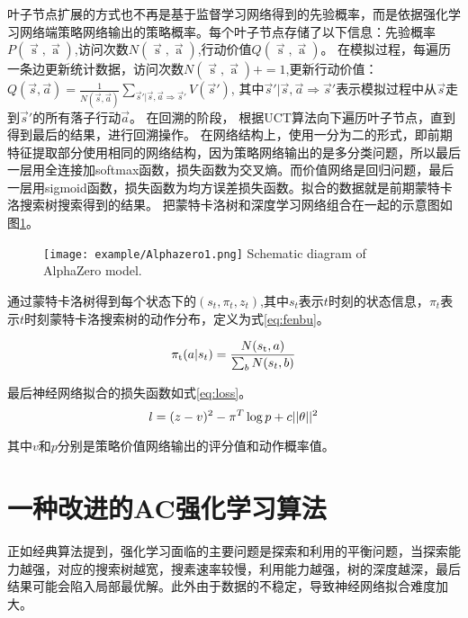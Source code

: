 叶子节点扩展的方式也不再是基于监督学习网络得到的先验概率，而是依据强化学习网络端策略网络输出的策略概率。每个叶子节点存储了以下信息：先验概率$P(\mathop s\limits^ \to  ,\mathop a\limits^ \to  )$,访问次数$N(\mathop s\limits^ \to  ,\mathop a\limits^ \to  )$,行动价值$Q(\mathop s\limits^ \to  ,\mathop a\limits^ \to  )$。
在模拟过程，每遍历一条边更新统计数据，访问次数${N(\mathop s\limits^ \to  ,\mathop a\limits^ \to  )} +=1$,更新行动价值：$Q(\vec{s},\vec{a})=\frac{1}{N(\vec{s},\vec{a})}\sum_{\vec{s}'\vert \vec{s},\vec{a}\Rightarrow \vec{s}'}V(\vec{s}')$, 其中$\vec{s}'\vert \vec{s},\vec{a} \Rightarrow \vec{s}'$表示模拟过程中从$\vec{s}$走到$\vec{s}'$的所有落子行动$\vec{a}$。
在回溯的阶段，
根据UCT算法向下遍历叶子节点，直到得到最后的结果，进行回溯操作。
在网络结构上，使用一分为二的形式，即前期特征提取部分使用相同的网络结构，因为策略网络输出的是多分类问题，所以最后一层用全连接加softmax函数，损失函数为交叉熵。而价值网络是回归问题，最后一层用sigmoid函数，损失函数为均方误差损失函数。拟合的数据就是前期蒙特卡洛搜索树搜索得到的结果。
把蒙特卡洛树和深度学习网络组合在一起的示意图如图\ref{fig:Alphazero1}。

\begin{figure}[htbp]
	\centering
	\texttt{[image: example/Alphazero1.png]}
	{Schematic diagram of AlphaZero model.}
	\label{fig:Alphazero1}
\end{figure}

通过蒙特卡洛树得到每个状态下的$({s_t},{\pi _t},{z_t})$,其中$s_t$表示$t$时刻的状态信息，$\pi_t$表示$t$时刻蒙特卡洛搜索树的动作分布，定义为式\ref{eq:fenbu}。

\begin{equation}
\label{eq:fenbu}
{\pi _{\rm{t}}}(a|{s_t}) = \frac{{N({s_{\rm{t}}},a)}}{{\sum\nolimits_b {N({s_t},b)} }}
\end{equation}

最后神经网络拟合的损失函数如式\ref{eq:loss}。
\begin{equation}
\label{eq:loss}
l = {(z - v)^2} - {\pi ^T}\log p + c{\rm{||}}\theta {\rm{|}}{{\rm{|}}^2}
\end{equation}

其中$v$和$p$分别是策略价值网络输出的评分值和动作概率值。

\section{一种改进的AC强化学习算法}

正如经典算法提到，强化学习面临的主要问题是探索和利用的平衡问题，当探索能力越强，对应的搜索树越宽，搜素速率较慢，利用能力越强，树的深度越深，最后结果可能会陷入局部最优解。此外由于数据的不稳定，导致神经网络拟合难度加大。


